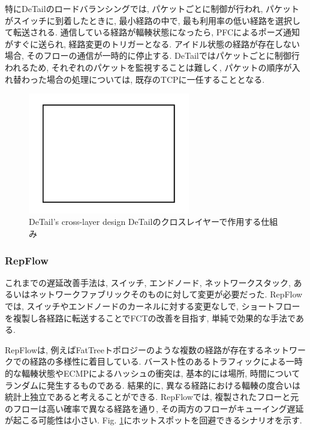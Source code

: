 特にDeTailのロードバランシングでは, パケットごとに制御が行われ, パケットがスイッチに到着したときに, 最小経路の中で,
最も利用率の低い経路を選択して転送される. 
通信している経路が輻輳状態になったら, PFCによるポーズ通知がすぐに送られ, 経路変更のトリガーとなる. 
アイドル状態の経路が存在しない場合, そのフローの通信が一時的に停止する.
DeTailではパケットごとに制御行われるため, それぞれのパケットを監視することは難しく, パケットの順序が入れ替わった場合の処理については,
既存のTCPに一任することとなる.
\begin{figure}[t]
    \begin{center}
    \includegraphics[autoebb, width=200pt]{./img/test.pdf}
    \caption{DeTail's cross-layer design DeTailのクロスレイヤーで作用する仕組み}
    \label{fig:repflow_scheario}
    \end{center}
\end{figure}



\subsubsection{RepFlow}
これまでの遅延改善手法は, スイッチ, エンドノード, ネットワークスタック, あるいはネットワークファブリックそのものに対して変更が必要だった. 
RepFlow\cite{repflow}では, スイッチやエンドノードのカーネルに対する変更なしで,
ショートフローを複製し各経路に転送することでFCTの改善を目指す, 単純で効果的な手法である. 

RepFlowは, 例えばFatTreeトポロジー\cite{fattree}のような複数の経路が存在するネットワークでの経路の多様性に着目している.
バースト性のあるトラフィックによる一時的な輻輳状態やECMPによるハッシュの衝突は, 基本的には場所, 時間についてランダムに発生するものである. 
結果的に, 異なる経路における輻輳の度合いは統計上独立であると考えることができる. 
RepFlowでは, 複製されたフローと元のフローは高い確率で異なる経路を通り, その両方のフローがキューイング遅延が起こる可能性は小さい. 
Fig. \ref{fig:repflow_scheario}にホットスポットを回避できるシナリオを示す. 


